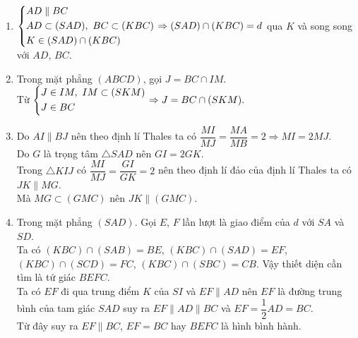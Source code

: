 \begin{bt}
{\begin{center}
		\end{center}
		\begin{enumerate}
			\item $\left\{\begin{aligned}&AD\parallel BC\\&AD\subset (SAD),\text{ }BC\subset (KBC)\\&K\in (SAD)\cap (KBC)\end{aligned}\right.\Rightarrow (SAD)\cap (KBC)=d$ qua $K$ và song song với $AD$, $BC$.
			\item Trong mặt phẳng $(ABCD)$, gọi $J=BC\cap IM$.\\
			Từ $\left\{\begin{aligned}&J\in IM, \text{ }IM\subset (SKM)\\&J\in BC\end{aligned}\right.\Rightarrow J=BC\cap (SKM).$
			\item Do $AI\parallel BJ$ nên theo định lí Thales ta có $\dfrac{MI}{MJ}=\dfrac{MA}{MB}=2\Rightarrow MI=2MJ.$\\
			Do $G$ là trọng tâm $\triangle SAD$ nên $GI=2GK$.\\
			Trong $\triangle KIJ$ có $\dfrac{MI}{MJ}=\dfrac{GI}{GK}=2$ nên theo định lí đảo của định lí Thales ta có $JK\parallel MG.$\\
			Mà $MG\subset (GMC)$ nên $JK\parallel (GMC).$ 
			\item Trong mặt phẳng $(SAD)$. Gọi $E$, $F$ lần lượt là giao điểm của $d$ với $SA$ và $SD$.\\
			Ta có $(KBC)\cap (SAB)=BE$, $(KBC)\cap (SAD)=EF$, $(KBC)\cap (SCD)=FC$, $(KBC)\cap (SBC)=CB$. Vậy thiết diện cần tìm là tứ giác $BEFC$.\\
			Ta có $EF$ đi qua trung điểm $K$ của $SI$ và $EF\parallel AD$ nên $EF$ là đường trung bình của tam giác $SAD$ suy ra $EF\parallel AD\parallel BC$ và $EF=\dfrac{1}{2}AD=BC.$\\
			Từ đây suy ra $EF\parallel BC$, $EF=BC$ hay $BEFC$ là hình bình hành. 
		\end{enumerate}
	}
\end{bt}
